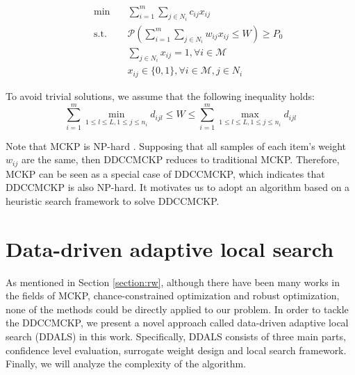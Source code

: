 \documentclass[lettersize,journal]{IEEEtran}
\begin{document}
\begin{subequations}
    \begin{align}
    & & \min \quad       &\sum\limits_{i=1}^m\sum\limits_{j\in N_i} c_{ij} x_{ij}    \\
    & & \text{s.t.}\quad &\mathcal{P}(\sum\limits_{i=1}^m\sum\limits_{j\in N_i} w_{ij} x_{ij}\leq W)\geq P_0 \label{cc}\\
    & &                  &\sum\limits_{j\in N_i}x_{ij}=1, \forall i \in \mathcal{M}\\
    & &                  &x_{ij}\in \{0,1\},\forall i \in \mathcal{M}, j\in N_i 
    \end{align}
    \label{formu_DDCCMCKP}
\end{subequations}

 To avoid trivial solutions, we assume that the following inequality holds:
\begin{equation}
    \sum\limits_{i=1}^m \min_{1\leq l \leq L, 1\leq j\leq n_i}d_{ijl} \leq W\leq \sum\limits_{i=1}^m \max_{1\leq l \leq L, 1\leq j\leq n_i}d_{ijl}
\end{equation}

Note that MCKP is NP-hard \cite{sinha1979multiple}. 
Supposing that all samples of each item's weight $w_{ij}$ are the same, then DDCCMCKP reduces to traditional MCKP. 
Therefore, MCKP can be seen as a special case of DDCCMCKP, which indicates that DDCCMCKP is also NP-hard. 
It motivates us to adopt an algorithm based on a heuristic search framework to solve DDCCMCKP.

\section{Data-driven adaptive local search}
\label{section:ddals}
As mentioned in Section \ref{section:rw}, although there have been many works in the fields of MCKP, chance-constrained optimization and robust optimization, none of the methods could be directly applied to our problem. 
In order to tackle the DDCCMCKP, we present a novel approach called data-driven adaptive local search (DDALS) in this work. 
Specifically, DDALS consists of three main parts, confidence level evaluation, surrogate weight design and local search framework. 
Finally, we will analyze the complexity of the algorithm.
\end{document}
